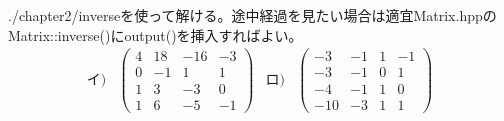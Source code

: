 \documentclass{jsarticle}
\begin{document}
\section{}
./chapter2/inverseを使って解ける。途中経過を見たい場合は適宜Matrix.hppのMatrix::inverse()にoutput()を挿入すればよい。
\[
	\begin{array}{rrrr}
		イ) &
		\left(
			\begin{array}{rrrr}
				4 & 18 & -16 & -3\\
				0 & -1 &   1 &  1\\
				1 &  3 &  -3 &  0\\
				1 &  6 &  -5 & -1
			\end{array}
		\right) &
		ロ) &
		\left(
			\begin{array}{rrrr}
				 -3 & -1 & 1 & -1\\
				 -3 & -1 & 0 &  1\\
				 -4 & -1 & 1 &  0\\
				-10 & -3 & 1 &  1
			\end{array}
		\right)
	\end{array}
\]
\end{document}
